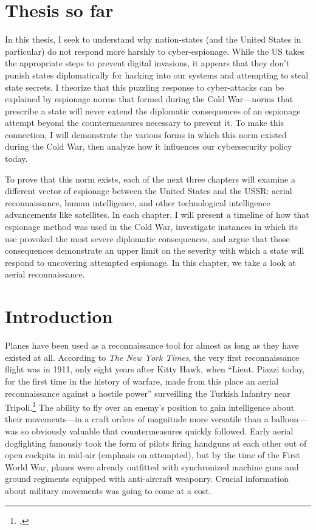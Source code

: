 \documentclass{report}
\begin{document}
\begin{refsegment}

\section*{Thesis so far}
\begin{em}
In this thesis, I seek to understand why nation-states (and the United States in particular) do not respond more harshly to cyber-espionage. While the US takes the appropriate steps to prevent digital invasions, it appears that they don't punish states diplomatically for hacking into our systems and attempting to steal state secrets. I theorize that this puzzling response to cyber-attacks can be explained by espionage norms that formed during the Cold War---norms that prescribe a state will never extend the diplomatic consequences of an espionage attempt beyond the countermeasures necessary to prevent it. To make this connection, I will demonstrate the various forms in which this norm existed during the Cold War, then analyze how it influences our cybersecurity policy today.

To prove that this norm exists, each of the next three chapters will examine a different vector of espionage between the United States and the USSR: aerial reconnaissance, human intelligence, and other technological intelligence advancements like satellites. In each chapter, I will present a timeline of how that espionage method was used in the Cold War, investigate instances in which its use provoked the most severe diplomatic consequences, and argue that those consequences demonstrate an upper limit on the severity with which a state will respond to uncovering attempted espionage. In this chapter, we take a look at aerial reconnaissance.
\end{em}


\section{Introduction}
Planes have been used as a reconnaissance tool for almost as long as they have existed at all. According to \emph{The New York Times}, the very first reconnaissance flight was in 1911, only eight years after Kitty Hawk, when ``Lieut. Piazzi today, for the first time in the history of warfare, made from this place an aerial reconnaissance against a hostile power'' surveilling the Turkish Infantry near Tripoli.\footcite{special_cable_to_the_new_york_times_air_1911} The ability to fly over an enemy's position to gain intelligence about their movements---in a craft orders of magnitude more versatile than a balloon---was so obviously valuable that countermeasures quickly followed. Early aerial dogfighting famously took the form of pilots firing handguns at each other out of open cockpits in mid-air (emphasis on attempted), but by the time of the First World War, planes were already outfitted with synchronized machine guns and ground regiments equipped with anti-aircraft weaponry. Crucial information about military movements was going to come at a cost.


\end{refsegment}
\end{document}
